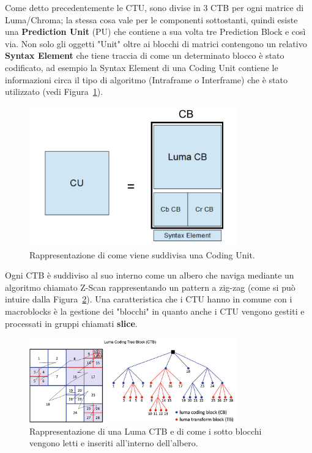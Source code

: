 \documentclass[a4paper,12pt, oneside]{article}
\begin{document}
Come detto precedentemente le CTU, sono divise in 3 CTB per ogni matrice di Luma/Chroma; la stessa
cosa vale per le componenti sottostanti, quindi esiste una \textbf{Prediction Unit} (PU) che contiene
a sua volta tre Prediction Block e così via. Non solo gli oggetti "Unit" oltre ai blocchi di matrici
contengono un relativo \textbf{Syntax Element} che tiene traccia di come un determinato blocco è
stato codificato, ad esempio la Syntax Element di una Coding Unit contiene le informazioni circa
 il tipo di algoritmo (Intraframe o Interframe) che è stato utilizzato (vedi Figura~\ref{fig:coding_unit}).
 
 \begin{figure}[h]
    \centering
    \includegraphics[width=0.8\textwidth]{images/coding-unit.png}
    \caption{Rappresentazione di come viene suddivisa una Coding Unit.}
    \label{fig:coding_unit}
\end{figure}

 \noindent Ogni CTB è suddiviso al suo interno come un albero che naviga mediante un algoritmo
chiamato Z-Scan rappresentando un pattern a zig-zag (come si può intuire dalla
Figura~\ref{fig:chroma_CTB}).
Una caratteristica che i CTU hanno in comune con i macroblocks è la gestione dei "blocchi"
in quanto anche i CTU vengono gestiti e processati in gruppi chiamati \textbf{slice}.

\begin{figure}[h]
    \centering
    \includegraphics[width=0.8\textwidth]{images/chroma-CTB.png}
    \caption{Rappresentazione di una Luma CTB e di come i sotto blocchi vengono letti e inseriti
    all'interno dell'albero.}
    \label{fig:chroma_CTB}
\end{figure}
\end{document}

